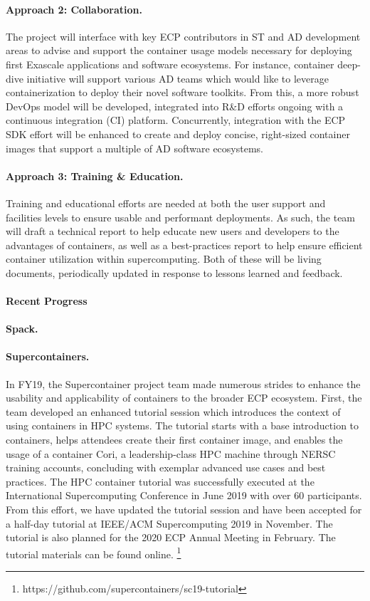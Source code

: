 \paragraph{Approach 2: Collaboration.}
The project will interface with key ECP contributors in ST and AD development areas to advise and support the container usage models necessary for deploying first Exascale applications and software ecosystems. For instance, container deep-dive initiative will support various AD teams which would like to leverage containerization to deploy their novel software toolkits. From this, a more robust DevOps model will be developed, integrated into R\&D efforts ongoing with a continuous integration (CI) platform. Concurrently, integration with the ECP SDK effort will be enhanced to create and deploy concise, right-sized container images that support a multiple of AD software ecosystems. 

\paragraph{Approach 3: Training \& Education.}
Training and educational efforts are needed at both the user support and facilities levels to ensure usable and performant deployments. As such, the team will draft a technical report to help educate new users and developers to the advantages of containers, as well as a best-practices report to help ensure efficient container utilization within supercomputing. Both of these will be living documents, periodically updated in response to lessons learned and feedback.


\paragraph{Recent Progress}

\paragraph{Spack.}

\paragraph{Supercontainers.}

In FY19, the Supercontainer project team made numerous strides to enhance the usability and applicability of containers to the broader ECP ecosystem. First, the team developed an enhanced tutorial session which introduces the context of using containers in HPC systems. The tutorial starts with a base introduction to containers, helps attendees create their first container image, and enables the usage of a container Cori, a leadership-class HPC machine through NERSC training accounts, concluding with exemplar advanced use cases and best practices. The HPC container tutorial was successfully executed at the International Supercomputing Conference in June 2019 with over 60 participants. From this effort, we have updated the tutorial session and have been accepted for a half-day tutorial at IEEE/ACM Supercomputing 2019 in November. The tutorial is also planned for the 2020 ECP Annual Meeting in February.  The tutorial materials can be found online. \footnote{https://github.com/supercontainers/sc19-tutorial}

